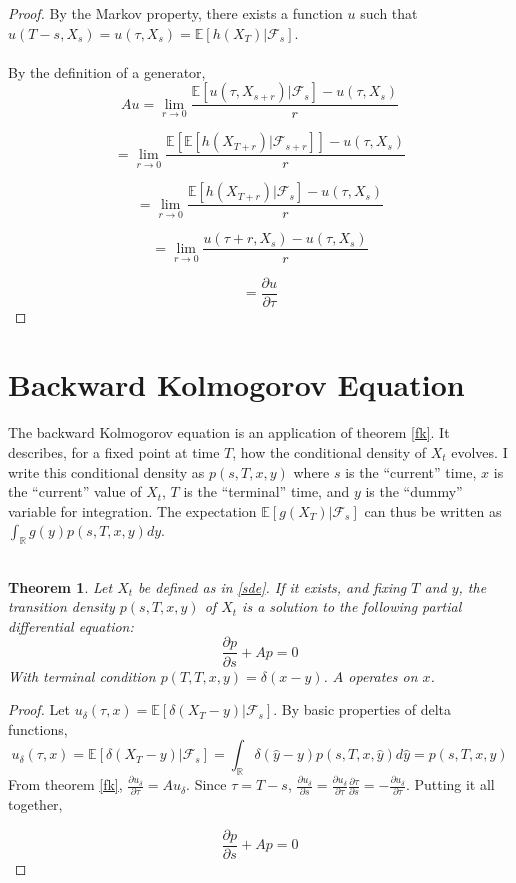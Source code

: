 \documentclass{article}
\newtheorem{theorem}{Theorem}
\theoremstyle{definition}
\begin{document}
\begin{proof}
	By the Markov property, there exists a function \(u\) such that \(u(T-s, X_s)=u(\tau, X_s)=\mathbb{E}[h(X_T)|\mathcal{F}_s]\). 
	\\
	\\
	By the definition of a generator,
	\[Au=\lim_{r \to 0} \frac{\mathbb{E}\left[ u(\tau, X_{s+r}) | \mathcal{F}_s \right] - u(\tau, X_s)}{r} \]
	
	\[ =  \lim_{r \to 0} \frac{\mathbb{E}\left[ \mathbb{E}\left[ h(X_{T+r}) | \mathcal{F}_{s+r} \right] \right] - u(\tau, X_s)}{r} \]
	
	\[ =  \lim_{r \to 0} \frac{ \mathbb{E}\left[ h(X_{T+r}) | \mathcal{F}_s \right] - u(\tau, X_s)}{r} \]
	
	\[ =  \lim_{r \to 0} \frac{ u(\tau+r, X_s) - u(\tau, X_s)}{r} \]
	
	\[= \frac{\partial u}{\partial \tau}\]
	

\end{proof}


\section{Backward Kolmogorov Equation}

The backward Kolmogorov equation is an application of theorem \ref{fk}.  It describes, for a fixed point at time \(T\), how the conditional density of \(X_t\) evolves.  I write this conditional density as \(p(s, T, x, y)\) where \(s\) is the ``current'' time, \(x\) is the ``current'' value of \(X_t\), \(T\) is the ``terminal'' time, and \(y\) is the ``dummy'' variable for integration.  The expectation \(\mathbb{E}[g(X_T)|\mathcal{F}_s]\) can thus be written as \(\int_\mathbb{R} g(y) p(s, T, x, y) dy \).   
\\
\\
\begin{theorem}\label{backk}
	Let \(X_t\) be defined as in \ref{sde}. If it exists, and fixing \(T\) and \(y\), the transition density \(p(s, T, x, y)\) of \(X_t\) is a solution to the following partial differential equation:
	\[\frac{\partial p}{\partial s} + Ap=0 \]
	With terminal condition \(p(T, T, x, y)=\delta(x-y)\).  \(A\) operates on \(x\).
\end{theorem}

\begin{proof}
	Let \(u_\delta (\tau, x)= \mathbb{E}\left[\delta(X_T-y)  | \mathcal{F}_s\right]\).
	By basic properties of delta functions, 
	\[u_\delta(\tau, x)=\mathbb{E}\left[\delta(X_T-y) | \mathcal{F}_s \right]=\int_\mathbb{R} \delta(\hat{y}-y) p(s, T, x, \hat{y}) d\hat{y}=p(s, T, x, y)\]
	From theorem \ref{fk}, \(\frac{\partial u_\delta}{\partial \tau}=Au_\delta\).  Since \(\tau=T-s\), \(\frac{\partial u_\delta}{\partial s} = \frac{\partial u_\delta}{\partial \tau} \frac{\partial \tau}{\partial s}=-\frac{\partial u_\delta}{\partial \tau} \).  Putting it all together, 
	
	\[\frac{\partial p}{\partial s} + Ap=0 \]
	
\end{proof}
\end{document}
